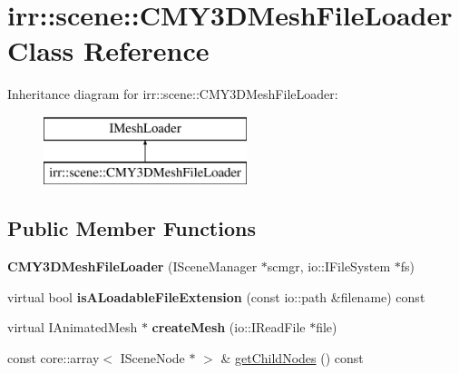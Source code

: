 \hypertarget{classirr_1_1scene_1_1_c_m_y3_d_mesh_file_loader}{\section{irr\-:\-:scene\-:\-:C\-M\-Y3\-D\-Mesh\-File\-Loader Class Reference}
\label{classirr_1_1scene_1_1_c_m_y3_d_mesh_file_loader}
}
Inheritance diagram for irr\-:\-:scene\-:\-:C\-M\-Y3\-D\-Mesh\-File\-Loader\-:\begin{figure}[H]
\begin{center}
\leavevmode
\includegraphics[height=2.000000cm]{classirr_1_1scene_1_1_c_m_y3_d_mesh_file_loader}
\end{center}
\end{figure}
\subsection*{Public Member Functions}
\begin{DoxyCompactItemize}
\item 
\hypertarget{classirr_1_1scene_1_1_c_m_y3_d_mesh_file_loader_a7ff02ad80803dc4a8d5ba53eec89611c}{{\bfseries C\-M\-Y3\-D\-Mesh\-File\-Loader} (I\-Scene\-Manager $\ast$scmgr, io\-::\-I\-File\-System $\ast$fs)}\label{classirr_1_1scene_1_1_c_m_y3_d_mesh_file_loader_a7ff02ad80803dc4a8d5ba53eec89611c}

\item 
\hypertarget{classirr_1_1scene_1_1_c_m_y3_d_mesh_file_loader_ab216c802018e29a6c538897f87eee862}{virtual bool {\bfseries is\-A\-Loadable\-File\-Extension} (const io\-::path \&filename) const }\label{classirr_1_1scene_1_1_c_m_y3_d_mesh_file_loader_ab216c802018e29a6c538897f87eee862}

\item 
\hypertarget{classirr_1_1scene_1_1_c_m_y3_d_mesh_file_loader_ad3e28ae8077dadbc57e58ff1c7a0d511}{virtual I\-Animated\-Mesh $\ast$ {\bfseries create\-Mesh} (io\-::\-I\-Read\-File $\ast$file)}\label{classirr_1_1scene_1_1_c_m_y3_d_mesh_file_loader_ad3e28ae8077dadbc57e58ff1c7a0d511}

\item 
const core\-::array$<$ I\-Scene\-Node $\ast$ $>$ \& \hyperlink{classirr_1_1scene_1_1_c_m_y3_d_mesh_file_loader_a68747761d1aada665124a70c51077f2a}{get\-Child\-Nodes} () const 
\end{DoxyCompactItemize}


